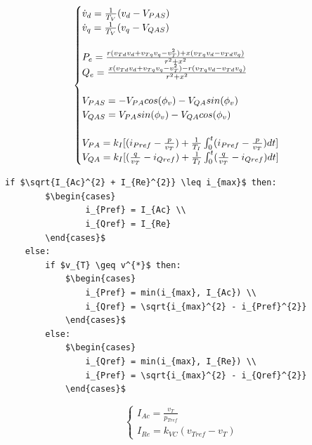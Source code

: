 \begin{equation}
	\begin{cases}
		\dot{v}_{d} = \frac{1}{T_{V}}(v_{d} - V_{PAS}) \\
		\dot{v}_{q} = \frac{1}{T_{V}}(v_{q} - V_{QAS}) \\
		\\
		P_{e} = \frac{r(v_{Td}v_{d} + v_{Tq}v_{q} - v_{T}^{2}) + x(v_{Tq}v_{d} - v_{Td}v_{q})}{r^{2} + x^{2}} \\
		Q_{e} = \frac{x(v_{Td}v_{d} + v_{Tq}v_{q} - v_{T}^{2}) - r(v_{Tq}v_{d} - v_{Td}v_{q})}{r^{2} + x^{2}} \\
		\\
		V_{PAS} = -V_{PA}cos(\phi_{v}) - V_{QA}sin(\phi_{v}) \\
		V_{QAS} = V_{PA}sin(\phi_{v}) - V_{QA}cos(\phi_{v}) \\
		\\
		V_{PA} = k_{I}[(i_{Pref} - \frac{p}{v_{T}}) +\frac{1}{T_{I}}\int\displaylimits_{0}^{t}	(i_{Pref} - \frac{p}{v_{T}})dt]\\
		V_{QA} = k_{I}[(\frac{q}{v_{T}} - i_{Qref}) +\frac{1}{T_{I}}\int\displaylimits_{0}^{t}	(\frac{q}{v_{T}} - i_{Qref})dt]
	\end{cases}
	\label{eq: Summary}
\end{equation}

\begin{center}
	\begin{lstlisting}[mathescape, columns=fullflexible]
	if $\sqrt{I_{Ac}^{2} + I_{Re}^{2}} \leq i_{max}$ then:
		$\begin{cases}
				i_{Pref} = I_{Ac} \\
				i_{Qref} = I_{Re}
		\end{cases}$
	else:
		if $v_{T} \geq v^{*}$ then:	
			$\begin{cases}
				i_{Pref} = min(i_{max}, I_{Ac}) \\
				i_{Qref} = \sqrt{i_{max}^{2} - i_{Pref}^{2}}
			\end{cases}$
		else:
			$\begin{cases}
				i_{Qref} = min(i_{max}, I_{Re}) \\
				i_{Pref} = \sqrt{i_{max}^{2} - i_{Qref}^{2}}
			\end{cases}$
	\end{lstlisting}
\end{center}

\begin{equation*}
	\begin{cases}
		I_{Ac} = \frac{v_{T}}{p_{Tref}} \\
		I_{Re} = k_{VC}(v_{Tref} - v_{T})
	\end{cases}
\end{equation*}

